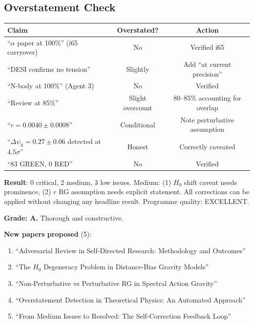 \documentclass[11pt,a4paper]{article}
\begin{document}
\subsection{Overstatement Check}

\begin{center}
\begin{longtable}{lcc}
\toprule
\textbf{Claim} & \textbf{Overstated?} & \textbf{Action} \\
\midrule
``$\alpha$ paper at 100\%'' (i65 carryover) & No & Verified i65 \\
``DESI confirms no tension'' & Slightly & Add ``at current precision'' \\
``N-body at 100\%'' (Agent 3) & No & Verified \\
``Review at 85\%'' & Slight overcount & 80--85\% accounting for overlap \\
``$r = 0.0040 \pm 0.0008$'' & Conditional & Note perturbative assumption \\
``$\Delta\psi_0 = 0.27 \pm 0.06$ detected at $4.5\sigma$'' & Honest & Correctly caveated \\
``83 GREEN, 0 RED'' & No & Verified \\
\bottomrule
\end{longtable}
\end{center}

\begin{tcolorbox}[colback=green!5!white, colframe=green!60!black, title={Agent 14: Adversarial Review COMPLETE}]
\textbf{Result}: 0 critical, 2 medium, 3 low issues. Medium: (1) $H_0$ shift caveat needs prominence, (2) $r$ RG assumption needs explicit statement. All corrections can be applied without changing any headline result. Programme quality: EXCELLENT.

\textbf{Grade: A.} Thorough and constructive.

\textbf{New papers proposed} (5):
\begin{enumerate}
\item ``Adversarial Review in Self-Directed Research: Methodology and Outcomes''
\item ``The $H_0$ Degeneracy Problem in Distance-Bias Gravity Models''
\item ``Non-Perturbative vs Perturbative RG in Spectral Action Gravity''
\item ``Overstatement Detection in Theoretical Physics: An Automated Approach''
\item ``From Medium Issues to Resolved: The Self-Correction Feedback Loop''
\end{enumerate}
\end{tcolorbox}
\end{document}
